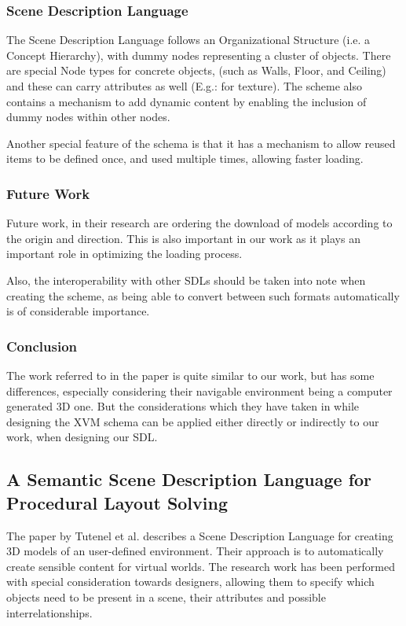 \subsubsection{Scene Description Language}
The Scene Description Language follows an Organizational Structure (i.e. a Concept Hierarchy), with dummy nodes representing a cluster of objects. There are special Node types for concrete objects, (such as Walls, Floor, and Ceiling) and these can carry attributes as well (E.g.: for texture). The scheme also contains a mechanism to add dynamic content by enabling the inclusion of dummy nodes within other nodes.

Another special feature of the schema is that it has a mechanism to allow reused items to be defined once, and used multiple times, allowing faster loading.

\subsubsection{Future Work}
Future work, in their research are ordering the download of models according to the origin and direction. This is also important in our work as it plays an important role in optimizing the loading process.

Also, the interoperability with other SDLs should be taken into note when creating the scheme, as being able to convert between such formats automatically is of considerable importance.

\subsubsection{Conclusion}
The work referred to in the paper is quite similar to our work, but has some differences, especially considering their navigable environment being a computer generated 3D one. But the considerations which they have taken in while designing the XVM schema can be applied either directly or indirectly to our work, when designing our SDL.

\subsection{A Semantic Scene Description Language for Procedural Layout Solving}

The paper by Tutenel et al. \cite{Tutenel2010} describes a Scene Description Language for creating 3D models of an user-defined environment. Their approach is to automatically create sensible content for virtual worlds. The research work has been performed with special consideration towards designers, allowing them to specify which objects need to be present in a scene, their attributes and possible interrelationships.

